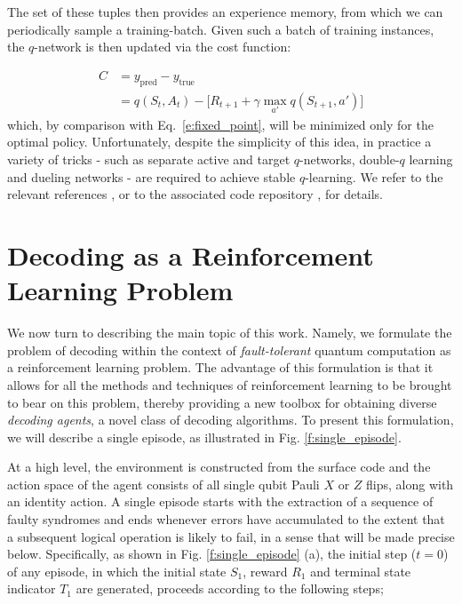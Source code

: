 \documentclass[twocolumn,preprintnumbers,amsmath,amssymb,notitlepage,nofootinbib,longbibliography,superscriptaddress,aps,pra,10pt]{revtex4-1}
\begin{document}
	\begin{equation}
		[S_t,A_t,R_{t+1},S_{t+1}]
	\end{equation}
	The set of these tuples then provides an experience memory, from which we can periodically sample a training-batch.
	Given such a batch of training instances, the $q$-network is then updated via the cost function:

	\begin{align} 
		C &= y_{\mathrm{pred}} - y_{\mathrm{true}}\\
		&= q(S_t,A_t) - \big[R_{t+1} + \gamma\max_{a'}q(S_{t+1},a') \big]
	\end{align}
	which, by comparison with Eq.~\eqref{e:fixed_point}, will be minimized only for the optimal policy.
	Unfortunately, despite the simplicity of this idea, in practice a variety of tricks - such as separate active and target $q$-networks, double-$q$ learning and dueling networks - are required to achieve stable $q$-learning.
	We refer to the relevant references \cite{RLMnih15,RLvan2016deep,RLschaul2015prioritized,RLwang2015dueling}, or to the associated code repository \cite{DeepQDecoding}, for details.

\section{Decoding as a Reinforcement Learning Problem}\label{s:decoding_as_rl}

	We now turn to describing the main topic of this work. 
	Namely, we formulate the problem of decoding within the context of \emph{fault-tolerant} quantum computation as a reinforcement learning problem.
	The advantage of this formulation is that it allows for all the methods and techniques of reinforcement learning to be brought to bear on this problem, thereby providing a new toolbox for obtaining diverse \emph{decoding agents}, a novel class of decoding algorithms.
	To present this formulation, we will describe a single episode, as illustrated in Fig. \ref{f:single_episode}.

	At a high level, the environment is constructed from the surface code and the action space of the agent consists of all single qubit Pauli $X$ or $Z$ flips, along with an identity action. 
	A single episode starts with the extraction of a sequence of faulty syndromes and ends whenever errors have accumulated to the extent that a subsequent logical operation is likely to fail, in a sense that will be made precise below.
	Specifically, as shown in Fig. \ref{f:single_episode} (a),  the initial step ($t=0$) of any episode, in which the initial state $S_1$, reward $R_1$ and terminal state indicator $T_1$ are generated, proceeds according to the following steps;
\end{document}
